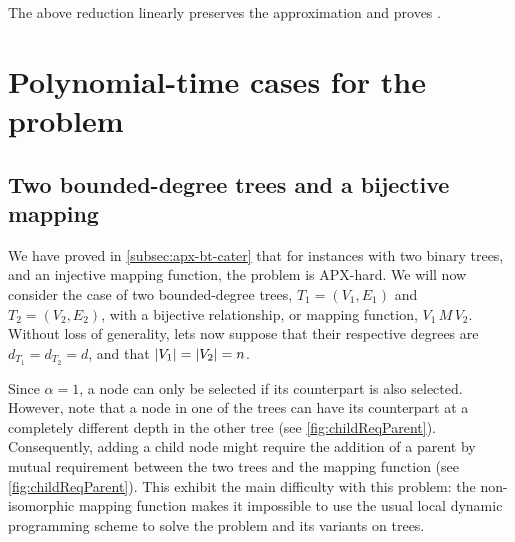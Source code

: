 		The above reduction linearly preserves the approximation and proves .

%

	\section{Polynomial-time cases for the \mwccs{} problem}
	\label{sec:poly}

   		\subsection{Two bounded-degree trees and a bijective mapping}
   		\label{subsec:tree1o1}
   
   			We have proved in \cref{subsec:apx-bt-cater} that for instances with two binary trees, and an injective mapping function, the problem is APX-hard.
   			We will now consider the case of two bounded-degree trees, $T_1 = (V_1, E_1)$ and $T_2 = (V_2, E_2)$, with a bijective relationship, or mapping function, $V_1\,M\,V_2$. Without loss of generality, lets now suppose that their respective degrees are $d_{T_1} = d_{T_2} = d$, and that $\lvert V_1\rvert = \lvert V_2\rvert = n$.
   
   
   			Since $\alpha=1$, a node can only be selected if its counterpart is also selected.
   			However, note that a node in one of the trees %
   			can have its counterpart at a completely different depth in the other tree %
   			 (see \cref{fig:childReqParent}).
   			Consequently, adding a child node might require the addition of a parent by mutual requirement between the two trees and the mapping function (see \cref{fig:childReqParent}).
   			This exhibit the main difficulty with this problem: the non-isomorphic mapping function makes it impossible to use the usual local dynamic programming scheme to solve the \mwcs{} problem and its variants on trees.
   
